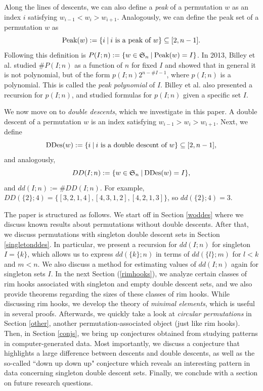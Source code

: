 \documentclass[11pt, a4paper, reqno]{article}
\numberwithin{equation}{section}
\newcommand{\s}{\hspace{0.08cm}}
\theoremstyle{definition}
\begin{document}
	 Along the lines of descents, we can also define a \textit{peak} of a permutation $w$ as an index $i$ satisfying $w_{i-1} < w_i > w_{i+1}$. Analogously, we can define the peak set of a permutation $w$ as $$\text{Peak}(w) := \{i \s|\s i \text{ is a peak of }w\} \subseteq [2,n-1].$$ Following this definition is $P(I;n) := \{w \in \mathfrak{S}_n \s|\s \text{Peak}(w) = I \}$. In 2013, Billey et al. \cite{bbs} studied $\#P(I;n)$ as a function of $n$ for fixed $I$ and showed that in general it is not polynomial, but of the form $p(I;n)2^{n-\#I-1}$, where $p(I;n)$ is a polynomial. This is called the \textit{peak polynomial} of $I$. Billey et al. also presented a recursion for $p(I;n)$, and studied formulas for $p(I;n)$ given a specific set $I$.
	
	 We now move on to \textit{double descents}, which we investigate in this paper. A double descent of a permutation $w$ is an index satisfying $w_{i-1} > w_i > w_{i+1}$. Next, we define $$\text{DDes}(w) := \{i \s|\s i \text{ is a double descent of }w \} \subseteq [2,n-1],$$ and analogously, $$DD(I;n) := \{w\in \mathfrak{S}_n \s|\s \text{DDes}(w) = I \},$$ and $dd(I;n) := \#DD(I;n)$. For example, $DD(\{2\}; 4) = \{[3,2,1,4], [4,3,1,2], [4,2,1,3]\}$, so $dd(\{2\}; 4) = 3$. 
	
	 The paper is structured as follows. We start off in Section \ref{woddes} where we discuss known results about permutations without double descents. After that, we discuss permutations with singleton double descent sets in Section \ref{singletonddes}. In particular, we present a recursion for $dd(I;n)$ for singleton $I = \{k\}$, which allows us to express $dd(\{k\};n)$ in terms of $dd(\{l\};m)$ for $l<k$ and $m<n$. We also discuss a method for estimating values of $dd(I; n)$ again for singleton sets $I$. In the next Section (\ref{rimhooks}), we analyze certain classes of rim hooks associated with singleton and empty double descent sets, and we also provide theorems regarding the sizes of these classes of rim hooks. While discussing rim hooks, we develop the theory of \textit{minimal elements}, which is useful in several proofs. Afterwards, we quickly take a look at \textit{circular permutations} in Section \ref{other}, another permutation-associated object (just like rim hooks). Then, in Section \ref{conjs}, we bring up conjectures obtained from studying patterns in computer-generated data. Most importantly, we discuss a conjecture that highlights a large difference between descents and double descents, as well as the so-called ``down up down up" conjecture which reveals an interesting pattern in data concerning singleton double descent sets. Finally, we conclude with a section on future research questions.
\end{document}

